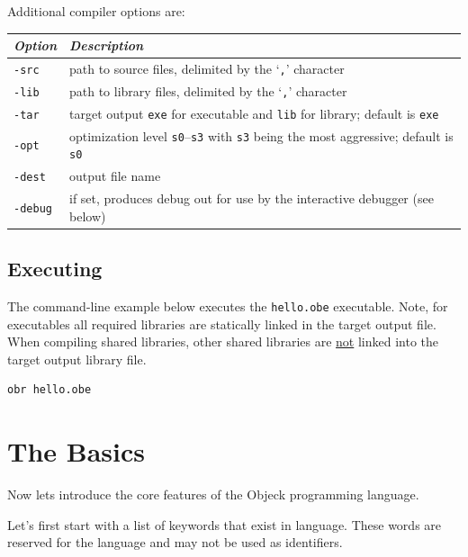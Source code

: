 \documentclass[11pt]{article}
\begin{document}
Additional compiler options are:
\begin{center}
  \begin{tabular}{| l | l |}
    \hline
    \emph{Option} & \emph{Description} \\ \hline \hline
    \texttt{-src} & path to source files, delimited by the `\texttt{,}' character \\ \hline
    \texttt{-lib} & path to library files, delimited by the `\texttt{,}'
    character\\ \hline
    \texttt{-tar} & target output \texttt{exe} for executable and \texttt{lib} for library; default is  \texttt{exe} \\ \hline
    \texttt{-opt} & optimization level \texttt{s0}--\texttt{s3} with \texttt{s3} being the most aggressive; default is \texttt{s0} \\ \hline
    \texttt{-dest} & output file name \\ \hline
    \texttt{-debug} & if set, produces debug out for use by the interactive debugger (see below) \\ \hline
  \end{tabular}
\end{center}

\subsection{Executing}
The command-line example below executes the \texttt{hello.obe}
executable. Note, for executables all required libraries are
statically linked in the target output file.  When compiling shared
libraries, other shared libraries are \underline{not} linked into the
target output library file.

\begin{verbatim}
obr hello.obe
\end{verbatim}

\section{The Basics}
Now lets introduce the core features of the Objeck programming
language.  \vspace{\baselineskip}

Let's first start with a list of keywords that exist in language.
These words are reserved for the language and may not be used as
identifiers.
\end{document}
